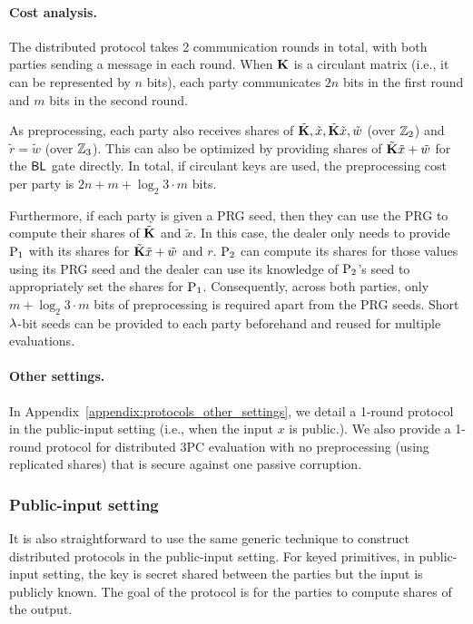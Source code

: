 \paragraph{Cost analysis.}
The distributed protocol takes 2 communication rounds in total, with both parties sending a message in each round. When $\mat{K}$ is a circulant matrix (i.e., it can be represented by $n$ bits), each party communicates $2n$ bits in the first round and $m$ bits in the second round.

As preprocessing, each party also receives shares of $\tilde{\mat{K}}, \tilde{x}, \tilde{\mat{K}}\tilde{x}, \tilde{w}$ (over $\mathbb{Z}_2$) and $\tilde{r} = \tilde{w}$ (over $\mathbb{Z}_3$). This can also be optimized by providing shares of $\tilde{\mat{K}}\tilde{x} + \tilde{w}$ for the $\textnormal{\textsf{BL}}$ gate directly. In total, if circulant keys are used, the preprocessing cost per party is $2n + m + \log_2{3}\cdot m$ bits.

Furthermore, if each party is given a PRG seed, then they can use the PRG to compute their shares of $\tilde{\mat{K}}$ and $\tilde{x}$. In this case, the dealer only needs to provide $\textnormal{P}_1$ with its shares for $\tilde{\mat{K}}\tilde{x} + \tilde{w}$ and $r$. $\textnormal{P}_2$ can compute its shares for those values using its PRG seed and the dealer can use its knowledge of $\textnormal{P}_2$'s seed to appropriately set the shares for $\textnormal{P}_1$. Consequently, across both parties, only $m + \log_2{3} \cdot m$ bits of preprocessing is required apart from the PRG seeds. Short $\lambda$-bit seeds can be provided to each party beforehand and reused for multiple evaluations.

\iffull\else
\paragraph{Other settings.} In Appendix~\ref{appendix:protocols_other_settings}, we detail a 1-round protocol in the public-input setting (i.e., when the input $x$ is public.). We also provide a 1-round protocol for distributed 3PC evaluation with no preprocessing (using replicated shares) that is secure against one passive corruption.
\fi

\fi

\iffull
\subsubsection{Public-input setting}
It is also straightforward to use the same generic technique to construct distributed protocols in the public-input setting. For keyed primitives, in public-input setting, the key is secret shared between the parties but the input is publicly known. The goal of the protocol is for the parties to compute shares of the output.

